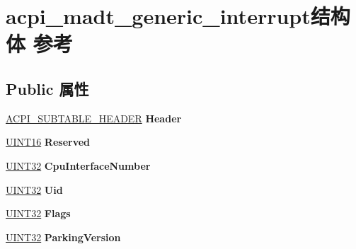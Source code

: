 \hypertarget{structacpi__madt__generic__interrupt}{}\section{acpi\+\_\+madt\+\_\+generic\+\_\+interrupt结构体 参考}
\label{structacpi__madt__generic__interrupt}
\subsection*{Public 属性}
\begin{DoxyCompactItemize}
\item 
\mbox{\label{structacpi__madt__generic__interrupt_af27a9f38cf76b35f1519fc567000c62e}} 
\hyperlink{structacpi__subtable__header}{A\+C\+P\+I\+\_\+\+S\+U\+B\+T\+A\+B\+L\+E\+\_\+\+H\+E\+A\+D\+ER} {\bfseries Header}
\item 
\mbox{\label{structacpi__madt__generic__interrupt_adc4b7fac1ba5e15b79f7d1df0ee222b6}} 
\hyperlink{_processor_bind_8h_a09f1a1fb2293e33483cc8d44aefb1eb1}{U\+I\+N\+T16} {\bfseries Reserved}
\item 
\mbox{\label{structacpi__madt__generic__interrupt_adc400951af628f7bee4210ea0fdda2c7}} 
\hyperlink{_processor_bind_8h_ae1e6edbbc26d6fbc71a90190d0266018}{U\+I\+N\+T32} {\bfseries Cpu\+Interface\+Number}
\item 
\mbox{\label{structacpi__madt__generic__interrupt_afb95ce8f71863f23fc8681e59bfbb0b7}} 
\hyperlink{_processor_bind_8h_ae1e6edbbc26d6fbc71a90190d0266018}{U\+I\+N\+T32} {\bfseries Uid}
\item 
\mbox{\label{structacpi__madt__generic__interrupt_a7447fc20621a30945f68a937a959a920}} 
\hyperlink{_processor_bind_8h_ae1e6edbbc26d6fbc71a90190d0266018}{U\+I\+N\+T32} {\bfseries Flags}
\item 
\mbox{\label{structacpi__madt__generic__interrupt_a8da1ed33f7acd34ef41aa1478a3689b2}} 
\hyperlink{_processor_bind_8h_ae1e6edbbc26d6fbc71a90190d0266018}{U\+I\+N\+T32} {\bfseries Parking\+Version}

\end{DoxyCompactItemize}

